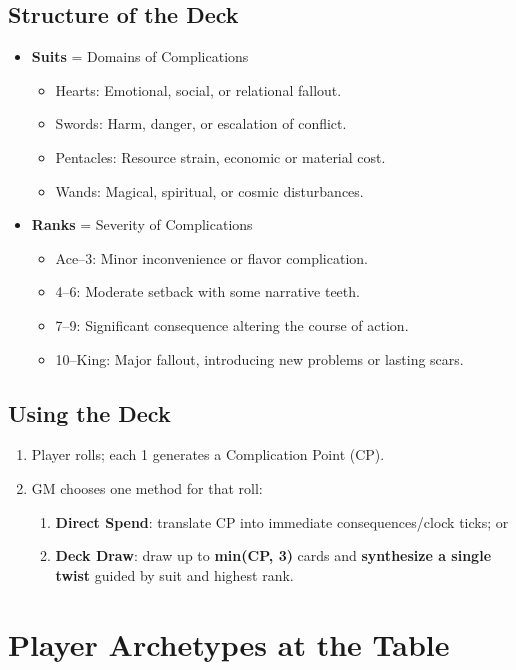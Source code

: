 \documentclass[11pt]{article}
\begin{document}
\subsection{Structure of the Deck}
\begin{itemize}
    \item \textbf{Suits} = Domains of Complications
    \begin{itemize}
        \item Hearts: Emotional, social, or relational fallout.
        \item Swords: Harm, danger, or escalation of conflict.
        \item Pentacles: Resource strain, economic or material cost.
        \item Wands: Magical, spiritual, or cosmic disturbances.
    \end{itemize}
    \item \textbf{Ranks} = Severity of Complications
    \begin{itemize}
        \item Ace–3: Minor inconvenience or flavor complication.
        \item 4–6: Moderate setback with some narrative teeth.
        \item 7–9: Significant consequence altering the course of action.
        \item 10–King: Major fallout, introducing new problems or lasting scars.
    \end{itemize}
\end{itemize}

\subsection{Using the Deck}
\begin{enumerate}
  \item Player rolls; each 1 generates a Complication Point (CP).
  \item GM chooses one method for that roll:
  \begin{enumerate}
    \item \textbf{Direct Spend}: translate CP into immediate consequences/clock ticks; or
    \item \textbf{Deck Draw}: draw up to \textbf{min(CP, 3)} cards and \textbf{synthesize a single twist}
    guided by suit and highest rank.
  \end{enumerate}
\end{enumerate}

\section{Player Archetypes at the Table}
\end{document}
